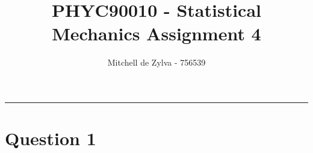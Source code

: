 \documentclass[11pt,a4paper]{article}
\begin{document}
\title{\bf PHYC90010 - Statistical Mechanics Assignment 4}
\author{Mitchell de Zylva - 756539}
\maketitle



\begin{center}
\vspace{1cm}
\rule{145mm}{0.5mm}
\vspace{1cm}
\end{center}
\tableofcontents
\newpage
%
\newpage




\section{Question 1 }
\label{sec:question1}
\end{document}
